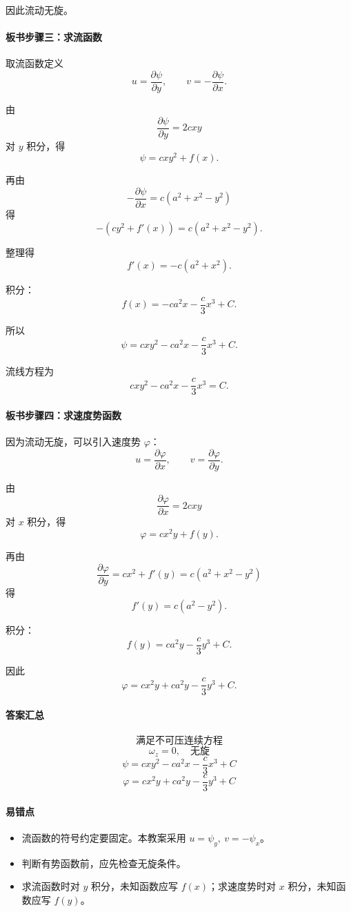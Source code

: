 ﻿\documentclass[12pt,a4paper]{ctexart}
\begin{document}
因此流动无旋。

\paragraph{板书步骤三：求流函数}
取流函数定义
\[
u=\frac{\partial\psi}{\partial y},
\qquad
v=-\frac{\partial\psi}{\partial x}.
\]

由
\[
\frac{\partial\psi}{\partial y}=2cxy
\]
对 $y$ 积分，得
\[
\psi=cxy^2+f(x).
\]

再由
\[
-\frac{\partial\psi}{\partial x}
=c(a^2+x^2-y^2)
\]
得
\[
-\left(cy^2+f'(x)\right)
=c(a^2+x^2-y^2).
\]

整理得
\[
f'(x)=-c(a^2+x^2).
\]

积分：
\[
f(x)=-ca^2x-\frac c3x^3+C.
\]

所以
\[
\boxed{
\psi=cxy^2-ca^2x-\frac c3x^3+C.
}
\]

流线方程为
\[
\boxed{
cxy^2-ca^2x-\frac c3x^3=C.
}
\]

\paragraph{板书步骤四：求速度势函数}
因为流动无旋，可以引入速度势 $\varphi$：
\[
u=\frac{\partial\varphi}{\partial x},
\qquad
v=\frac{\partial\varphi}{\partial y}.
\]

由
\[
\frac{\partial\varphi}{\partial x}=2cxy
\]
对 $x$ 积分，得
\[
\varphi=cx^2y+f(y).
\]

再由
\[
\frac{\partial\varphi}{\partial y}
=cx^2+f'(y)
=c(a^2+x^2-y^2)
\]
得
\[
f'(y)=c(a^2-y^2).
\]

积分：
\[
f(y)=ca^2y-\frac c3y^3+C.
\]

因此
\[
\boxed{
\varphi=cx^2y+ca^2y-\frac c3y^3+C.
}
\]

\paragraph{答案汇总}
\[
\boxed{\text{满足不可压连续方程}}
\]
\[
\boxed{\omega_z=0,\quad \text{无旋}}
\]
\[
\boxed{
\psi=cxy^2-ca^2x-\frac c3x^3+C
}
\]
\[
\boxed{
\varphi=cx^2y+ca^2y-\frac c3y^3+C
}
\]

\paragraph{易错点}
\begin{itemize}
  \item 流函数的符号约定要固定。本教案采用 $u=\psi_y,\ v=-\psi_x$。
  \item 判断有势函数前，应先检查无旋条件。
  \item 求流函数时对 $y$ 积分，未知函数应写 $f(x)$；求速度势时对 $x$ 积分，未知函数应写 $f(y)$。
\end{itemize}
\end{document}
